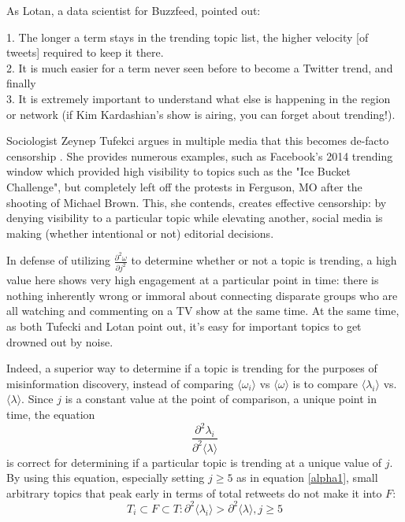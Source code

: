 \documentclass[preprint,review,12pt]{elsarticle}
\begin{document}
As Lotan, a data scientist for Buzzfeed, pointed out:
\begin{displayquote}
1. The longer a term stays in the trending topic list, the higher velocity [of tweets] required to keep it there. \\
2. It is much easier for a term never seen before to become a Twitter trend, and finally \\
3. It is extremely important to understand what else is happening in the region or network (if Kim Kardashian’s show is airing, you can forget about trending!).
\end{displayquote}

Sociologist Zeynep Tufekci argues in multiple media that this becomes de-facto censorship \citep{tufekci2017twitter,tufecki2018democracy,tufekci2017we,tufekci2014online}. She provides numerous examples, such as Facebook's 2014 trending window which provided high visibility to topics such as the "Ice Bucket Challenge", but completely left off the protests in Ferguson, MO after the shooting of Michael Brown. This, she contends, creates effective censorship: by denying visibility to a particular topic while elevating another, social media is making (whether intentional or not) editorial decisions. 

In defense of utilizing $\frac{\partial^2 \omega}{\partial j^2}$ to determine whether or not a topic is trending, a high value here shows very high engagement at a particular point in time: there is nothing inherently wrong or immoral about connecting disparate groups who are all watching and commenting on a TV show at the same time. At the same time, as both Tufecki and Lotan point out, it's easy for important topics to get drowned out by noise.


Indeed, a superior way to determine if a topic is trending for the purposes of misinformation discovery, instead of comparing $\langle \omega_i \rangle$ vs $\langle \omega \rangle$ is to compare $\langle \lambda_i \rangle$ vs. $\langle \lambda \rangle$. Since $j$ is a constant value at the point of comparison, a unique point in time, the equation \[\frac{\partial^2 \lambda_i}
{\partial^2 \langle \lambda \rangle}\] is correct for determining if a particular topic is trending at a unique value of $j$. By using this equation, especially setting $j \geq 5$ as in equation \ref{alpha1}, small arbitrary topics that peak early in terms of total retweets do not make it into $F$:
\begin{equation}
    \label{Trending}
    T_i \subset F \subset T: \partial^2 \langle \lambda_i \rangle > \partial^2 \langle \lambda \rangle, j \geq 5
\end{equation}
\end{document}
